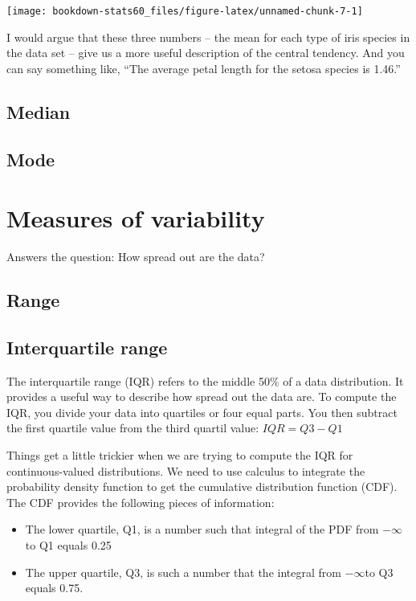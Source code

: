 \documentclass[]{book}
\providecommand{\tightlist}{%
  \setlength{\itemsep}{0pt}\setlength{\parskip}{0pt}}
\begin{document}
\begin{center}\texttt{[image: bookdown-stats60\_files/figure-latex/unnamed-chunk-7-1]} \end{center}

I would argue that these three numbers -- the mean for each type of iris
species in the data set -- give us a more useful description of the
central tendency. And you can say something like, ``The average petal
length for the setosa species is 1.46.''

\subsection{Median}\label{median}

\subsection{Mode}\label{mode}

\section{Measures of variability}\label{measures-of-variability}

Answers the question: How spread out are the data?

\subsection{Range}\label{range}

\subsection{Interquartile range}\label{interquartile-range}

The interquartile range (IQR) refers to the middle 50\% of a data
distribution. It provides a useful way to describe how spread out the
data are. To compute the IQR, you divide your data into quartiles or
four equal parts. You then subtract the first quartile value from the
third quartil value: \(IQR = Q3 − Q1\)

Things get a little trickier when we are trying to compute the IQR for
continuous-valued distributions. We need to use calculus to integrate
the probability density function to get the cumulative distribution
function (CDF). The CDF provides the following pieces of information:

\begin{itemize}
\tightlist
\item
  The lower quartile, Q1, is a number such that integral of the PDF from
  \(-\infty\) to Q1 equals 0.25
\item
  The upper quartile, Q3, is such a number that the integral from
  \(-\infty\)to Q3 equals 0.75.
\end{itemize}
\end{document}
